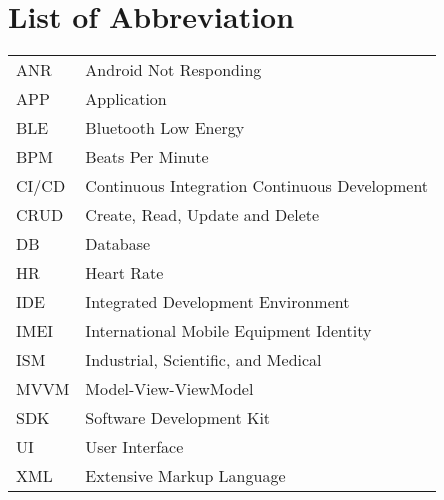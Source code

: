 \chapter{List of Abbreviation}

\begin{longtable}{p{} p{}}
    ANR & Android Not Responding \\
    APP & Application \\
    BLE & Bluetooth Low Energy \\
    BPM & Beats Per Minute \\
    CI/CD & Continuous Integration Continuous Development \\
    CRUD & Create, Read, Update and Delete \\
    DB & Database \\
    HR & Heart Rate \\
    IDE & Integrated Development Environment \\
    IMEI & International Mobile Equipment Identity \\
    ISM & Industrial, Scientific, and Medical \\
    MVVM & Model-View-ViewModel \\
    SDK & Software Development Kit \\
    UI & User Interface \\
    XML & Extensive Markup Language \\

\end{longtable}